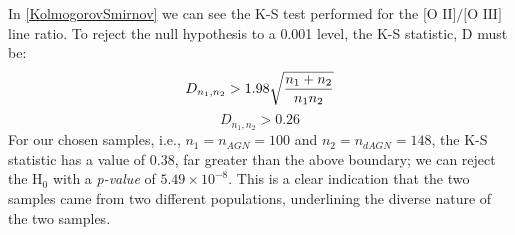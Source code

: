 In \ref{KolmogorovSmirnov} we can see the K-S test performed for the $\text{[O II]}/\text{[O III]}$ line ratio. To reject the null hypothesis to a 0.001 level, the K-S statistic, D must be:
\begin{equation}
D_{n_1,n_2}>1.98\sqrt{{n_1+n_2}\over {n_1n_2}}
\end{equation}
\begin{equation}
D_{n_1,n_2}> 0.26
\end{equation}
For our chosen samples, i.e., $n_{1}=n_{AGN}=100$ and $n_{2}=n_{dAGN}=148$, the K-S statistic has a value of $0.38$, far greater than the above boundary; we can reject the $\text{H}_{0}$ with a \textit{p-value} of $5.49\times10^{-8}$. This is a clear indication that the two samples came from two different populations, underlining the diverse nature of the two samples.
  
  